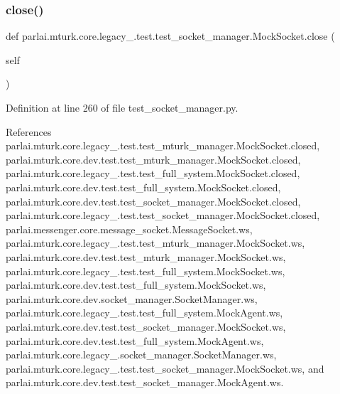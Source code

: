 \subsubsection{\texorpdfstring{close()}{close()}}
{\footnotesize\ttfamily def parlai.\+mturk.\+core.\+legacy\+\_.\+test.\+test\+\_\+socket\+\_\+manager.\+Mock\+Socket.\+close (\begin{DoxyParamCaption}\item[{}]{self }\end{DoxyParamCaption})}



Definition at line 260 of file test\+\_\+socket\+\_\+manager.\+py.



References parlai.\+mturk.\+core.\+legacy\+\_.\+test.\+test\+\_\+mturk\+\_\+manager.\+Mock\+Socket.\+closed, parlai.\+mturk.\+core.\+dev.\+test.\+test\+\_\+mturk\+\_\+manager.\+Mock\+Socket.\+closed, parlai.\+mturk.\+core.\+legacy\+\_.\+test.\+test\+\_\+full\+\_\+system.\+Mock\+Socket.\+closed, parlai.\+mturk.\+core.\+dev.\+test.\+test\+\_\+full\+\_\+system.\+Mock\+Socket.\+closed, parlai.\+mturk.\+core.\+dev.\+test.\+test\+\_\+socket\+\_\+manager.\+Mock\+Socket.\+closed, parlai.\+mturk.\+core.\+legacy\+\_.\+test.\+test\+\_\+socket\+\_\+manager.\+Mock\+Socket.\+closed, parlai.\+messenger.\+core.\+message\+\_\+socket.\+Message\+Socket.\+ws, parlai.\+mturk.\+core.\+legacy\+\_.\+test.\+test\+\_\+mturk\+\_\+manager.\+Mock\+Socket.\+ws, parlai.\+mturk.\+core.\+dev.\+test.\+test\+\_\+mturk\+\_\+manager.\+Mock\+Socket.\+ws, parlai.\+mturk.\+core.\+legacy\+\_.\+test.\+test\+\_\+full\+\_\+system.\+Mock\+Socket.\+ws, parlai.\+mturk.\+core.\+dev.\+test.\+test\+\_\+full\+\_\+system.\+Mock\+Socket.\+ws, parlai.\+mturk.\+core.\+dev.\+socket\+\_\+manager.\+Socket\+Manager.\+ws, parlai.\+mturk.\+core.\+legacy\+\_.\+test.\+test\+\_\+full\+\_\+system.\+Mock\+Agent.\+ws, parlai.\+mturk.\+core.\+dev.\+test.\+test\+\_\+socket\+\_\+manager.\+Mock\+Socket.\+ws, parlai.\+mturk.\+core.\+dev.\+test.\+test\+\_\+full\+\_\+system.\+Mock\+Agent.\+ws, parlai.\+mturk.\+core.\+legacy\+\_.\+socket\+\_\+manager.\+Socket\+Manager.\+ws, parlai.\+mturk.\+core.\+legacy\+\_.\+test.\+test\+\_\+socket\+\_\+manager.\+Mock\+Socket.\+ws, and parlai.\+mturk.\+core.\+dev.\+test.\+test\+\_\+socket\+\_\+manager.\+Mock\+Agent.\+ws.

\mbox{\label{classparlai_1_1mturk_1_1core_1_1legacy__2018_1_1test_1_1test__socket__manager_1_1MockSocket_a8b738cb107a8f4b45e5c523d5553de1c}} 
